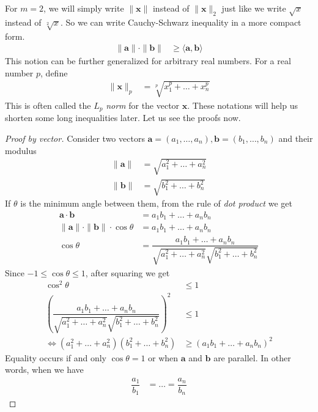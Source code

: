 \documentclass{subfile}
\begin{document}
	For $m=2$, we will simply write $\| \mathbf{x}\| $ instead of $\| \mathbf{x}\| _2$ just like we write $\sqrt{x}$ instead of $\sqrt[2]{x}$. So we can write Cauchy-Schwarz inequality in a more compact form.
		\begin{align*}
			\| \mathbf{a}\| \cdot\| \mathbf{b}\| 
				& \geq\langle\mathbf{a},\mathbf{b}\rangle
		\end{align*}
	This notion can be further generalized for arbitrary real numbers. For a real number $p$, define
		\begin{align*}
			\| \mathbf{x}\| _p
				& = \sqrt[p]{x_1^p+\ldots+x_n^p}
		\end{align*}
	This is often called the $L_p$ \emph{norm} for the vector $\mathbf{x}$. These notations will help us shorten some long inequalities later. Let us see the proofs now.
		\begin{proof}[Proof by vector]
			Consider two vectors $\mathbf{a}=(a_1,\ldots,a_n),\mathbf{b}=(b_1,\ldots,b_n)$ and their modulus
				\begin{align*}
					\| \mathbf{a}\| 
						& = \sqrt{a_1^2+\ldots+a_n^2}\\
					\| \mathbf{b}\| 
						& = \sqrt{b_1^2+\ldots+b_n^2}
				\end{align*}
			If $\theta$ is the minimum angle between them, from the rule of \emph{dot product} we get
				\begin{align*}
					\mathbf{a}\cdot\mathbf{b}
						& = a_1b_1+\ldots+a_nb_n\\
					\| \mathbf{a}\| \cdot\| \mathbf{b}\| \cdot\cos\theta
						& = a_1b_1+\ldots+a_nb_n\\
					\cos{\theta}
						& = \dfrac{a_1b_1+\ldots+a_nb_n}{\sqrt{a_1^2+\ldots+a_n^2}\sqrt{b_1^2+\ldots+b_n^2}}
				\end{align*}
			Since $-1\leq\cos\theta\leq1$, after squaring we get
				\begin{align*}
					\cos^2\theta
						& \leq1\\
					\left(\dfrac{a_1b_1+\ldots+a_nb_n}{\sqrt{a_1^2+\ldots+a_n^2}\sqrt{b_1^2+\ldots+b_n^2}}\right)^2
						& \leq1\\
					\iff (a_1^2+\ldots+a_n^2)(b_1^2+\ldots+b_n^2)
						& \geq(a_1b_1+\ldots+a_nb_n)^2
				\end{align*}
			Equality occurs if and only $\cos\theta=1$ or when $\mathbf{a}$ and $\mathbf{b}$ are parallel. In other words, when we have
				\begin{align*}
					\dfrac{a_1}{b_1}& = \ldots=\dfrac{a_n}{b_n}
				\end{align*}
		\end{proof}
	
\end{document}
